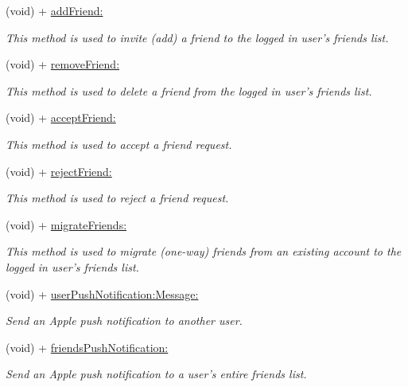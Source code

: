 \begin{DoxyCompactItemize}
(void) + \hyperlink{interface_fuse_s_d_k_a92b5888d1e5dafe2ab2a76fda44be4d8}{add\+Friend\+:}
\begin{DoxyCompactList}\small\item\em This method is used to invite (add) a friend to the logged in user's friends list. \end{DoxyCompactList}\item 
(void) + \hyperlink{interface_fuse_s_d_k_a1556fd18ab2ae7f062c9d2ebbe2498fc}{remove\+Friend\+:}
\begin{DoxyCompactList}\small\item\em This method is used to delete a friend from the logged in user's friends list. \end{DoxyCompactList}\item 
(void) + \hyperlink{interface_fuse_s_d_k_ae93cfa17f5b00ab1d28c53a8577c1af0}{accept\+Friend\+:}
\begin{DoxyCompactList}\small\item\em This method is used to accept a friend request. \end{DoxyCompactList}\item 
(void) + \hyperlink{interface_fuse_s_d_k_a8af1416799fd2922db49ed1de406f537}{reject\+Friend\+:}
\begin{DoxyCompactList}\small\item\em This method is used to reject a friend request. \end{DoxyCompactList}\item 
(void) + \hyperlink{interface_fuse_s_d_k_a199e36abe741ecdf8062d1afddc6e146}{migrate\+Friends\+:}
\begin{DoxyCompactList}\small\item\em This method is used to migrate (one-\/way) friends from an existing account to the logged in user's friends list. \end{DoxyCompactList}\item 
(void) + \hyperlink{interface_fuse_s_d_k_a84916a862fe925004f0c2d3c2b16aa28}{user\+Push\+Notification\+:\+Message\+:}
\begin{DoxyCompactList}\small\item\em Send an Apple push notification to another user. \end{DoxyCompactList}\item 
(void) + \hyperlink{interface_fuse_s_d_k_a9afa8ec3f16cd18706902dd1f38c3501}{friends\+Push\+Notification\+:}
\begin{DoxyCompactList}\small\item\em Send an Apple push notification to a user's entire friends list. \end{DoxyCompactList}\item 

\end{DoxyCompactItemize}
